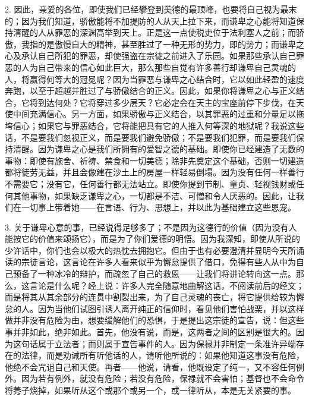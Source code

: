 2. 因此，亲爱的各位，即使我们已经攀登到美德的最顶峰，也要将自己视为最末的；因为我们知道，骄傲能将不加提防的人从天上拉下来，而谦卑之心能将知道保持清醒的人从罪恶的深渊高举到天上。正是这一点使税吏位于法利塞人之前；而骄傲，我指的是傲慢自大的精神，甚至胜过了一种无形的势力，即的势力；而谦卑之心及承认自己所犯的罪恶，却使强盗在宗徒之前进入了乐园。如果那些承认自己罪恶的人为自己带来的信心如此巨大，那么那些自觉有许多善行却谦卑自己灵魂的人，将赢得何等大的冠冕呢？因为当罪恶与谦卑之心结合时，它以如此轻盈的速度奔跑，以至于超越并胜过了与骄傲结合的正义。因此，如果你将谦卑之心与正义结合，它将到达何处？它将穿过多少层天？它必定会在天主的宝座前停下步伐，在天使中间充满信心。另一方面，如果骄傲与正义结合，以其罪恶的过重和分量足以拖垮信心；如果它与罪恶结合，它将能把具有它的人推入何等深的地狱呢？我说这些话，不是要我们忽视正义，而是要我们避免骄傲；不是要我们犯罪，而是要我们保持清醒。因为谦卑之心是我们所拥有的爱智之德的基础。即使你已经建造了无数的事物：即使有施舍、祈祷、禁食和一切美德；除非先奠定这个基础，否则一切建造都将徒劳无益，并且会像建在沙土上的房屋一样轻易倒塌。因为没有任何一样善行不需要它；没有它，任何善行都无法站立。即使你提到节制、童贞、轻视钱财或任何其他事物，如果缺乏谦卑之心，一切都是不洁、可憎和令人厌恶的。因此，让我们在一切事上带着她——在言语、行为、思想上，并以此为基础建立这些恩宠。\par

3. 关于谦卑心意的事，已经说得足够多了；不是因为这德行的价值（因为没有人能按它的价值来颂扬它），而是为了你们爱德的明悟。因为我深知，即使从所说的少许话中，你们也会以极大的热忱去拥抱它。但由于也有必要澄清并显明今天所诵读的宗徒言论，这言论在许多人看来似乎为懈怠提供了借口，免得有些人从中为自己预备了一种冰冷的辩护，而疏忽了自己的救恩——让我们将讲论转向这一点。那么，这言论是什么呢？经上说：许多人完全随意地曲解这话，不阅读前后的经文；而是将其从其余部分的连贯中割裂出来，为了自己灵魂的丧亡，将它提供给较为懈怠的人。因为当他们试图引诱人离开纯正的信仰时，看见他们害怕战栗，并以这样做并非没有危险为由，想要缓解他们的恐惧，于是提出这宗徒的宣告，说：但这些事并非如此，绝非如此。首先，他没有说，而是，这两者之间的区别是很大的。因为这句话属于立法者；而则属于宣告事件的人。因为保禄并非制定一条准许异端存在的法律，而是劝诫所有听他话的人，请听他所说的：如果他知道这事没有危险，他绝不会咒诅自己和天使。再者——他说，请看，他既设定了纯一，又不容任何例外。因为若有例外，就没有危险；若没有危险，保禄就不会害怕；基督也不会命令将莠子烧掉，如果听从这个或那个或另一个，或一律听从，本是无关紧要的事。\par

